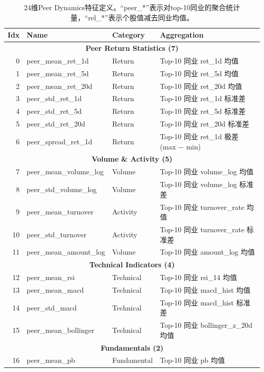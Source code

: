 \begin{table}[H]
\centering
\caption{24维Peer Dynamics特征定义。``peer\_*''表示对top-10同业的聚合统计量，``rel\_*''表示个股值减去同业均值。}
\label{tab:appendix_peer}
\begin{tabular}{@{}rlll@{}}
\toprule
Idx & Name & Category & Aggregation \\
\midrule
\multicolumn{4}{c}{\textbf{Peer Return Statistics (7)}} \\
0  & peer\_mean\_ret\_1d   & Return & Top-10 同业 ret\_1d 均值 \\
1  & peer\_mean\_ret\_5d   & Return & Top-10 同业 ret\_5d 均值 \\
2  & peer\_mean\_ret\_20d  & Return & Top-10 同业 ret\_20d 均值 \\
3  & peer\_std\_ret\_1d    & Return & Top-10 同业 ret\_1d 标准差 \\
4  & peer\_std\_ret\_5d    & Return & Top-10 同业 ret\_5d 标准差 \\
5  & peer\_std\_ret\_20d   & Return & Top-10 同业 ret\_20d 标准差 \\
6  & peer\_spread\_ret\_1d & Return & Top-10 同业 ret\_1d 极差 (max $-$ min) \\
\midrule
\multicolumn{4}{c}{\textbf{Volume \& Activity (5)}} \\
7  & peer\_mean\_volume\_log & Volume & Top-10 同业 volume\_log 均值 \\
8  & peer\_std\_volume\_log  & Volume & Top-10 同业 volume\_log 标准差 \\
9  & peer\_mean\_turnover   & Activity & Top-10 同业 turnover\_rate 均值 \\
10 & peer\_std\_turnover    & Activity & Top-10 同业 turnover\_rate 标准差 \\
11 & peer\_mean\_amount\_log & Volume & Top-10 同业 amount\_log 均值 \\
\midrule
\multicolumn{4}{c}{\textbf{Technical Indicators (4)}} \\
12 & peer\_mean\_rsi       & Technical & Top-10 同业 rsi\_14 均值 \\
13 & peer\_mean\_macd      & Technical & Top-10 同业 macd\_hist 均值 \\
14 & peer\_std\_macd       & Technical & Top-10 同业 macd\_hist 标准差 \\
15 & peer\_mean\_bollinger & Technical & Top-10 同业 bollinger\_z\_20d 均值 \\
\midrule
\multicolumn{4}{c}{\textbf{Fundamentals (2)}} \\
16 & peer\_mean\_pb        & Fundamental & Top-10 同业 pb 均值 \\

\end{tabular}
\end{table}
